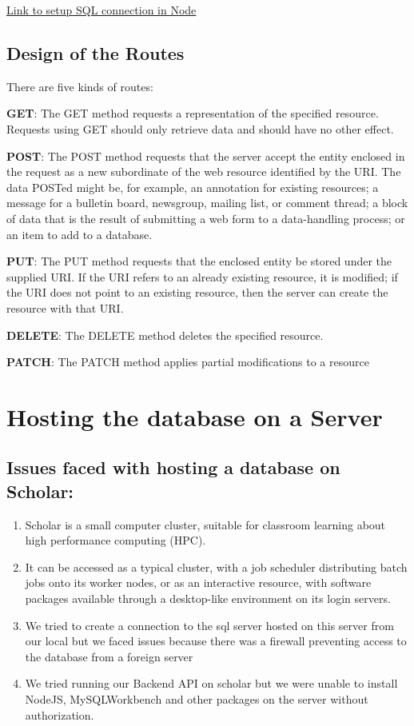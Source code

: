 \documentclass[]{book}
\providecommand{\tightlist}{%
  \setlength{\itemsep}{0pt}\setlength{\parskip}{0pt}}
\begin{document}
\href{https://bezkoder.com/node-js-rest-api-express-mysql/}{Link to
setup SQL connection in Node}

\subsection{Design of the Routes}\label{design-of-the-routes}

There are five kinds of routes:

\textbf{GET}: The GET method requests a representation of the specified
resource. Requests using GET should only retrieve data and should have
no other effect.

\textbf{POST}: The POST method requests that the server accept the
entity enclosed in the request as a new subordinate of the web resource
identified by the URI. The data POSTed might be, for example, an
annotation for existing resources; a message for a bulletin board,
newsgroup, mailing list, or comment thread; a block of data that is the
result of submitting a web form to a data-handling process; or an item
to add to a database.

\textbf{PUT}: The PUT method requests that the enclosed entity be stored
under the supplied URI. If the URI refers to an already existing
resource, it is modified; if the URI does not point to an existing
resource, then the server can create the resource with that URI.

\textbf{DELETE}: The DELETE method deletes the specified resource.

\textbf{PATCH}: The PATCH method applies partial modifications to a
resource

\section{Hosting the database on a
Server}\label{hosting-the-database-on-a-server}

\subsection{Issues faced with hosting a database on
Scholar:}\label{issues-faced-with-hosting-a-database-on-scholar}

\begin{enumerate}
\def\labelenumi{\arabic{enumi}.}
\tightlist
\item
  Scholar is a small computer cluster, suitable for classroom learning
  about high performance computing (HPC).
\item
  It can be accessed as a typical cluster, with a job scheduler
  distributing batch jobs onto its worker nodes, or as an interactive
  resource, with software packages available through a desktop-like
  environment on its login servers.
\item
  We tried to create a connection to the sql server hosted on this
  server from our local but we faced issues because there was a firewall
  preventing access to the database from a foreign server
\item
  We tried running our Backend API on scholar but we were unable to
  install NodeJS, MySQLWorkbench and other packages on the server
  without authorization.
\end{enumerate}
\end{document}
